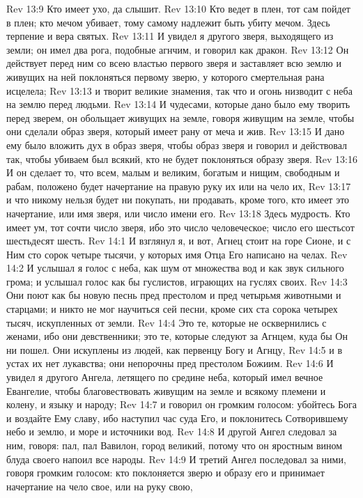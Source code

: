 Rev 13:9  Кто имеет ухо, да слышит.
Rev 13:10  Кто ведет в плен, тот сам пойдет в плен; кто мечом убивает, тому самому надлежит быть убиту мечом. Здесь терпение и вера святых.
Rev 13:11  И увидел я другого зверя, выходящего из земли; он имел два рога, подобные агнчим, и говорил как дракон.
Rev 13:12  Он действует перед ним со всею властью первого зверя и заставляет всю землю и живущих на ней поклоняться первому зверю, у которого смертельная рана исцелела;
Rev 13:13  и творит великие знамения, так что и огонь низводит с неба на землю перед людьми.
Rev 13:14  И чудесами, которые дано было ему творить перед зверем, он обольщает живущих на земле, говоря живущим на земле, чтобы они сделали образ зверя, который имеет рану от меча и жив.
Rev 13:15  И дано ему было вложить дух в образ зверя, чтобы образ зверя и говорил и действовал так, чтобы убиваем был всякий, кто не будет поклоняться образу зверя.
Rev 13:16  И он сделает то, что всем, малым и великим, богатым и нищим, свободным и рабам, положено будет начертание на правую руку их или на чело их,
Rev 13:17  и что никому нельзя будет ни покупать, ни продавать, кроме того, кто имеет это начертание, или имя зверя, или число имени его.
Rev 13:18  Здесь мудрость. Кто имеет ум, тот сочти число зверя, ибо это число человеческое; число его шестьсот шестьдесят шесть.
Rev 14:1  И взглянул я, и вот, Агнец стоит на горе Сионе, и с Ним сто сорок четыре тысячи, у которых имя Отца Его написано на челах.
Rev 14:2  И услышал я голос с неба, как шум от множества вод и как звук сильного грома; и услышал голос как бы гуслистов, играющих на гуслях своих.
Rev 14:3  Они поют как бы новую песнь пред престолом и пред четырьмя животными и старцами; и никто не мог научиться сей песни, кроме сих ста сорока четырех тысяч, искупленных от земли.
Rev 14:4  Это те, которые не осквернились с женами, ибо они девственники; это те, которые следуют за Агнцем, куда бы Он ни пошел. Они искуплены из людей, как первенцу Богу и Агнцу,
Rev 14:5  и в устах их нет лукавства; они непорочны пред престолом Божиим.
Rev 14:6  И увидел я другого Ангела, летящего по средине неба, который имел вечное Евангелие, чтобы благовествовать живущим на земле и всякому племени и колену, и языку и народу;
Rev 14:7  и говорил он громким голосом: убойтесь Бога и воздайте Ему славу, ибо наступил час суда Его, и поклонитесь Сотворившему небо и землю, и море и источники вод.
Rev 14:8  И другой Ангел следовал за ним, говоря: пал, пал Вавилон, город великий, потому что он яростным вином блуда своего напоил все народы.
Rev 14:9  И третий Ангел последовал за ними, говоря громким голосом: кто поклоняется зверю и образу его и принимает начертание на чело свое, или на руку свою,
